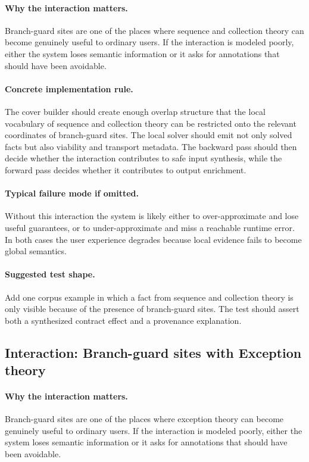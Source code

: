 \documentclass[11pt]{report}
\theoremstyle{definition}
\theoremstyle{plain}
\begin{document}
\paragraph{Why the interaction matters.}
Branch-guard sites are one of the places where sequence and collection theory can become
genuinely useful to ordinary users. If the interaction is modeled poorly,
either the system loses semantic information or it asks for annotations that
should have been avoidable.

\paragraph{Concrete implementation rule.}
The cover builder should create enough overlap structure that the local
vocabulary of sequence and collection theory can be restricted onto the relevant
coordinates of branch-guard sites. The local solver should emit not only
solved facts but also viability and transport metadata. The backward pass
should then decide whether the interaction contributes to safe input
synthesis, while the forward pass decides whether it contributes to output
enrichment.

\paragraph{Typical failure mode if omitted.}
Without this interaction the system is likely either to over-approximate and
lose useful guarantees, or to under-approximate and miss a reachable runtime
error. In both cases the user experience degrades because local evidence
fails to become global semantics.

\paragraph{Suggested test shape.}
Add one corpus example in which a fact from sequence and collection theory is only
visible because of the presence of branch-guard sites. The test should
assert both a synthesized contract effect and a provenance explanation.

\subsection{Interaction: Branch-guard sites with Exception theory}

\paragraph{Why the interaction matters.}
Branch-guard sites are one of the places where exception theory can become
genuinely useful to ordinary users. If the interaction is modeled poorly,
either the system loses semantic information or it asks for annotations that
should have been avoidable.
\end{document}
